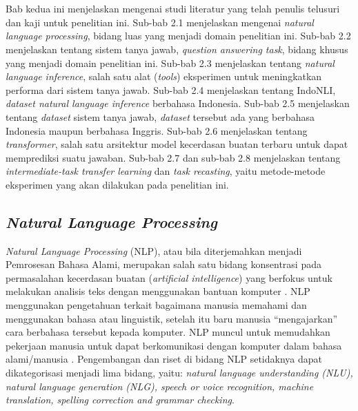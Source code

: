 \chapter{\babDua}
\label{bab:2}
Bab kedua ini menjelaskan mengenai studi literatur yang telah penulis telusuri dan kaji untuk penelitian ini. Sub-bab 2.1 menjelaskan mengenai \emph{natural language processing}, bidang luas yang menjadi domain penelitian ini. Sub-bab 2.2 menjelaskan tentang sistem tanya jawab, \emph{question answering task}, bidang khusus yang menjadi domain penelitian ini. Sub-bab 2.3 menjelaskan tentang \emph{natural language inference}, salah satu alat (\emph{tools}) eksperimen untuk meningkatkan performa dari sistem tanya jawab. Sub-bab 2.4 menjelaskan tentang IndoNLI, \emph{dataset natural language inference} berbahasa Indonesia. Sub-bab 2.5 menjelaskan tentang \emph{dataset} sistem tanya jawab, \emph{dataset} tersebut ada yang berbahasa Indonesia maupun berbahasa Inggris. Sub-bab 2.6 menjelaskan tentang \emph{transformer}, salah satu arsitektur model kecerdasan buatan terbaru untuk dapat memprediksi suatu jawaban. Sub-bab 2.7 dan sub-bab 2.8 menjelaskan tentang \emph{intermediate-task transfer learning} dan \emph{task recasting}, yaitu metode-metode eksperimen yang akan dilakukan pada penelitian ini.

\section{\emph{Natural Language Processing}}
\emph{Natural Language Processing} (NLP), atau bila diterjemahkan menjadi Pemrosesan Bahasa Alami, merupakan salah satu bidang konsentrasi pada permasalahan kecerdasan buatan (\emph{artificial intelligence}) yang berfokus untuk melakukan analisis teks dengan menggunakan bantuan komputer \citep{article-nlp}. NLP menggunakan pengetahuan terkait bagaimana manusia memahami dan menggunakan bahasa atau linguistik, setelah itu baru manusia “mengajarkan” cara berbahasa tersebut kepada komputer. NLP muncul untuk memudahkan pekerjaan manusia untuk dapat berkomunikasi dengan komputer dalam bahasa alami/manusia \citep{nlp-state-of-the-art}. Pengembangan dan riset di bidang NLP setidaknya dapat dikategorisasi menjadi lima bidang, yaitu: \emph{natural language understanding (NLU), natural language generation (NLG), speech or voice recognition, machine translation, spelling correction and grammar checking}. 

